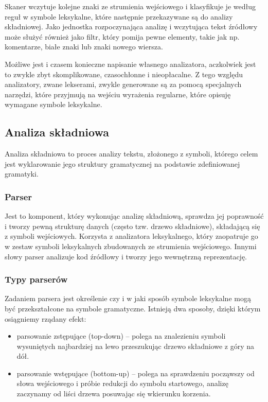 \documentclass[a4paper,12pt]{article}
\begin{document}
Skaner wczytuje kolejne znaki ze strumienia wejściowego i klasyfikuje je według reguł w symbole leksykalne, które następnie przekazywane są do analizy składniowej. Jako jednostka rozpoczynająca analizę i wczytująca tekst źródłowy może służyć również jako filtr, który pomija pewne elementy, takie jak np. komentarze, białe znaki lub znaki nowego wiersza.


Możliwe jest i czasem konieczne napisanie własnego analizatora, aczkolwiek jest to zwykle zbyt skomplikowane, czasochłonne i nieopłacalne. Z tego względu analizatory, zwane lekserami, zwykle generowane są za pomocą specjalnych narzędzi, które przyjmują na wejściu wyrażenia regularne, które opisuję wymagane symbole leksykalne.

\subsection{Analiza składniowa}

Analiza składniowa to proces analizy tekstu, złożonego z symboli, którego celem jest wyklarowanie jego struktury gramatycznej na podstawie zdefiniowanej gramatyki.

\subsubsection{Parser}

Jest to komponent, który wykonując analizę składniową, sprawdza jej poprawność i tworzy pewną strukturę danych (często tzw. drzewo składniowe), składającą się z symboli wejściowych. Korzysta z analizatora leksykalnego, który zaopatruje go w zestaw symboli leksykalnych zbudowanych ze strumienia wejściowego. Innymi słowy parser analizuje kod źródłowy i tworzy jego wewnętrzną reprezentację.

\subsubsection{Typy parserów}

Zadaniem parsera jest określenie czy i w jaki sposób symbole leksykalne mogą być przekształcone na symbole gramatyczne. Istnieją dwa sposoby, dzięki którym osiągniemy rządany efekt:
\begin{itemize}
	\item parsowanie zstępujące (top-down) -- polega na znalezieniu symboli wysuniętych najbardziej na lewo przeszukując drzewo składniowe z góry na dół.
	\item parsowanie wstępujące (bottom-up) -- polega na sprawdzeniu począwszy od słowa wejściowego i próbie redukcji do symbolu startowego, analizę zaczynamy od liści drzewa posuwając się wkierunku korzenia.
\end{itemize}
\end{document}

